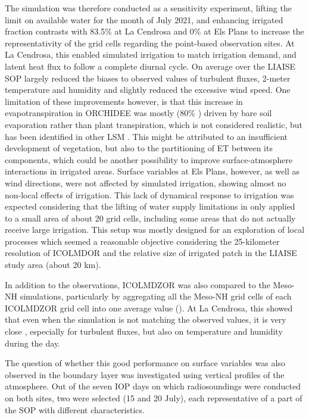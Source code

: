 The \irrboost simulation was therefore conducted as a sensitivity experiment, lifting the limit on available water for the month of July 2021, and enhancing irrigated fraction contrasts with 83.5\% at La Cendrosa and 0\% at Els Plans to increase the representativity of the grid cells regarding the point-based observation sites. 
At La Cendrosa, this enabled simulated irrigation to match irrigation demand, and latent heat flux to follow a complete diurnal cycle. On average over the LIAISE SOP \irrboost largely reduced the biases to observed values of turbulent fluxes, 2-meter temperature and humidity and slightly reduced the excessive wind speed. 
One limitation of these improvements however, is that this increase in evapotranspiration in ORCHIDEE was mostly (80\% %
) driven by bare soil evaporation rather than plant transpiration, which is not considered realistic, but has been identified in other LSM \citep{marti_implementation_2025}. %
This might be attributed to an insufficient development of vegetation, but also to the partitioning of ET between its components, which could be another possibility to improve surface-atmosphere interactions in irrigated areas.
Surface variables at Els Plans, however, as well as wind directions, were not affected by simulated irrigation, showing almost no non-local effects of irrigation. 
This lack of dynamical response to irrigation was expected considering that the lifting of water supply limitations in \irrboost only applied to a small area of about 20 grid cells, including some areas that do not actually receive large irrigation. This setup was mostly designed for an exploration of local processes which seemed a reasonable objective considering the 25-kilometer resolution of ICOLMDOR and the relative size of irrigated patch in the LIAISE study area (about 20 km).

In addition to the observations, ICOLMDZOR was also compared to the Meso-NH simulations, particularly by aggregating all the Meso-NH grid cells of each ICOLMDZOR grid cell into one average value (\mesomean). At La Cendrosa, this showed that even when the \irrboost simulation is not matching the observed values, it is very close \mesomean, especially for turbulent fluxes, but also on temperature and humidity during the day. 

\hfill

The question of whether this good performance on surface variables was also observed in the boundary layer was investigated using vertical profiles of the atmosphere. Out of the seven IOP days on which radiosoundings were conducted on both sites, two were selected (15 and 20 July), each representative of a part of the SOP with different characteristics.

